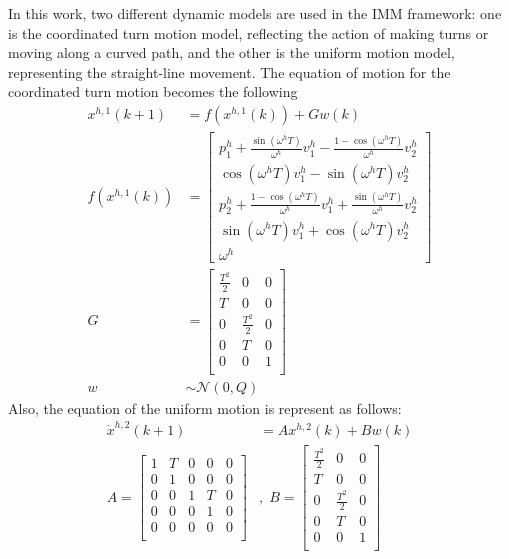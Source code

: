 \documentclass[letterpaper, 10 pt, conference]{ieeeconf}
\begin{document}
	In this work, two different dynamic models are used in the IMM framework: one is the coordinated turn motion model, reflecting the action of making turns or moving along a curved path, and the other is the uniform motion model, representing the straight-line movement. 
	The equation of motion for the coordinated turn motion becomes the following 
	\begin{subequations}
		\begin{align}
			x^{h,1}(k+1)&= f(x^{h,1}(k))+Gw(k)\\
			f(x^{h,1}(k))&=\left[
			\begin{array}{c}
				p^h_1+\frac{\sin(\omega^h T)}{\omega^h}v^h_1-\frac{1-\cos(\omega^h T)}{\omega^h}v^h_2\\
				\cos(\omega^h T)v^h_1-\sin(\omega^h T)v^h_2\\
				p^h_2+\frac{1-\cos(\omega^h T)}{\omega^h}v^h_1+\frac{\sin(\omega^h T)}{\omega^h}v^h_2\\
				\sin(\omega^h T)v^h_1+\cos(\omega^h T)v^h_2\\
				\omega^h 
			\end{array}\right]\\
			G &= \left[
			\begin{array}{ccc}
				\frac{T^2}{2}& 0& 0\\
				T& 0& 0\\
				0& \frac{T^2}{2}& 0\\
				0& T& 0\\
				0& 0& 1\\
			\end{array}\right]\\
			w&\sim\mathcal{N}(0,Q)
		\end{align}
	\end{subequations}
	Also, the equation of the uniform motion is represent as follows:
	\begin{subequations}
		\begin{align}
			\dot{x}^{h,2}(k+1)&= Ax^{h,2}(k)+Bw(k)\label{eqn:h_d_dyn}\\
			A=\left[
			\begin{array}{ccccc}
				1& T& 0& 0& 0\\
				0& 1& 0& 0& 0\\
				0& 0& 1& T& 0\\
				0& 0& 0& 1& 0\\
				0& 0& 0& 0& 0\\
			\end{array}\right]&,\;
			B=\left[
			\begin{array}{ccc}
				\frac{T^2}{2}& 0& 0\\
				T& 0& 0\\
				0& \frac{T^2}{2}& 0\\
				0& T& 0\\
				0& 0& 1\\
			\end{array}\right]
		\end{align}
	\end{subequations}
\end{document}
